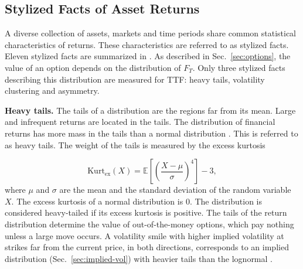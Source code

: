 
\subsection{Stylized Facts of Asset Returns}\label{sec:stylized-facts}
A diverse collection of assets, markets and time periods share common statistical characteristics of returns. These characteristics are referred to as stylized facts. Eleven stylized facts are summarized in \textcite{contEmpiricalPropertiesAsset2001}. As described in Sec.~\ref{sec:options}, the value of an option depends on the distribution of $F_T$. Only three stylized facts describing this distribution are measured for TTF: heavy tails, volatility clustering and asymmetry.

\textbf{Heavy tails.} The tails of a distribution are the regions far from its mean. Large and infrequent returns are located in the tails. The distribution of financial returns has more mass in the tails than a normal distribution \parencite{contEmpiricalPropertiesAsset2001}. This is referred to as heavy tails. The weight of the tails is measured by the excess kurtosis

\begin{equation}
    \mathrm{Kurt}_{\mathrm{ex}}(X) = \mathbb{E}\!\left[\left(\frac{X-\mu}{\sigma}\right)^{4}\right] - 3,
    \label{eq:kurtosis}
\end{equation}
where $\mu$ and $\sigma$ are the mean and the standard deviation of the random variable $X$. The excess kurtosis of a normal distribution is 0. The distribution is considered heavy-tailed if its excess kurtosis is positive. The tails of the return distribution determine the value of out-of-the-money options, which pay nothing unless a large move occurs. A volatility smile  with higher implied volatility at strikes far from the current price, in both directions, corresponds to an implied distribution (Sec.~\ref{sec:implied-vol}) with heavier tails than the lognormal \parencite[453]{hullOptionsFuturesOther2022}.

